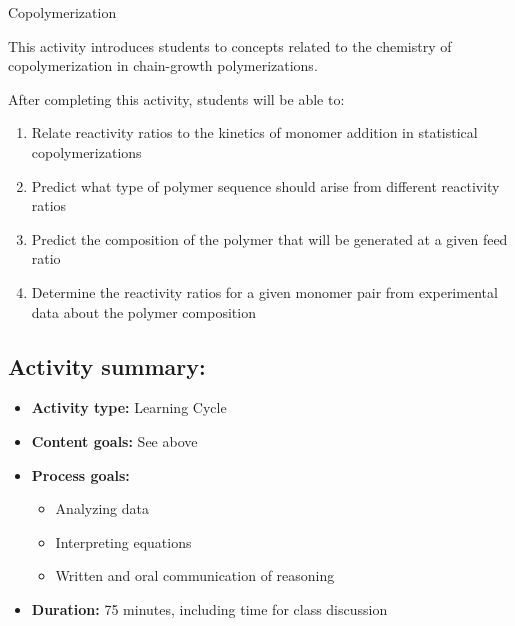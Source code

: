 %
%
%
%

\renewcommand{\figpath}{content/polymchem/copolymers/copolym/figs}
\renewcommand{\labelbase}{copolym}

\begin{activity}{Copolymerization}

\begin{instructornotes}
	This activity introduces students to concepts related to the chemistry of copolymerization in chain-growth polymerizations.
	
	After completing this activity, students will be able to:
	\begin{enumerate}
		\item Relate reactivity ratios to the kinetics of monomer addition in statistical copolymerizations
		\item Predict what type of polymer sequence should arise from different reactivity ratios
		\item Predict the composition of the polymer that will be generated at a given feed ratio
		\item Determine the reactivity ratios for a given monomer pair from experimental data about the polymer composition
	\end{enumerate}
	
	\subsection*{Activity summary:}
	\begin{itemize}
		\item \textbf{Activity type:} Learning Cycle
		\item \textbf{Content goals:} See above
		\item \textbf{Process goals:} %
			\begin{itemize}
				\item Analyzing data
				\item Interpreting equations
				\item Written and oral communication of reasoning
			\end{itemize}
		\item \textbf{Duration:} 75 minutes, including time for class discussion
		

\end{itemize}
\end{instructornotes}
\end{activity}
